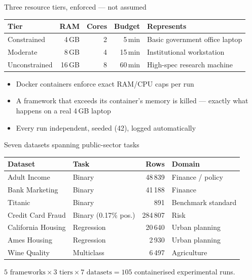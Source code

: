 \documentclass[aspectratio=169,10pt]{beamer}
\begin{document}
\begin{frame}{Three resource tiers, enforced --- not assumed}
  \centering
  \begin{tabular}{@{}lrrrl@{}}
    \toprule
    Tier & RAM & Cores & Budget & Represents \\
    \midrule
    Constrained   & 4\,GB  & 2 & 5\,min  & Basic government office laptop \\
    Moderate      & 8\,GB  & 4 & 15\,min & Institutional workstation \\
    Unconstrained & 16\,GB & 8 & 60\,min & High-spec research machine \\
    \bottomrule
  \end{tabular}
  \vfill
  \begin{itemize}
    \item Docker containers enforce exact RAM/CPU caps per run
    \item A framework that exceeds its container's memory is killed ---
          exactly what happens on a real 4\,GB laptop
    \item Every run independent, seeded (42), logged automatically
  \end{itemize}
\end{frame}

\begin{frame}{Seven datasets spanning public-sector tasks}
  \centering
  \begin{tabular}{@{}llrl@{}}
    \toprule
    Dataset & Task & Rows & Domain \\
    \midrule
    Adult Income        & Binary        & 48\,839  & Finance / policy \\
    Bank Marketing      & Binary        & 41\,188  & Finance \\
    Titanic             & Binary        & 891      & Benchmark standard \\
    Credit Card Fraud   & Binary (0.17\% pos.) & 284\,807 & Risk \\
    California Housing  & Regression    & 20\,640  & Urban planning \\
    Ames Housing        & Regression    & 2\,930   & Urban planning \\
    Wine Quality        & Multiclass    & 6\,497   & Agriculture \\
    \bottomrule
  \end{tabular}
  \vfill
  $5 \text{ frameworks} \times 3 \text{ tiers} \times 7 \text{ datasets}
   = 105$ containerised experimental runs.
\end{frame}
\end{document}
